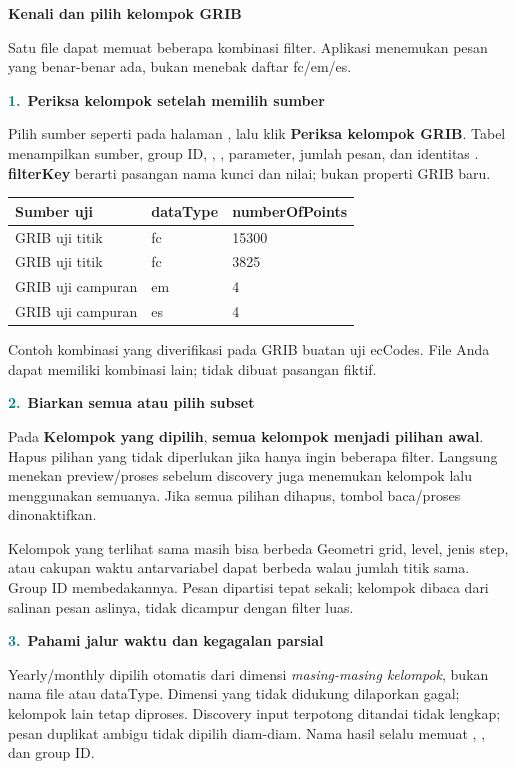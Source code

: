\documentclass[11pt,a4paper]{article}
\newcommand{\step}[2]{\par\addvspace{2mm}\noindent\textcolor{teal}{\textbf{#1.}}\ \textbf{#2}\par\nobreak}
\newcommand{\pagetitle}[3]{\clearpage{\color{teal}\small\bfseries LANGKAH #1}\par{\color{slate}\LARGE\bfseries #2}\par\vspace{2mm}#3\par\vspace{3mm}}
\begin{document}
\pagetitle{9}{Kenali dan pilih kelompok GRIB}{Satu file dapat memuat beberapa kombinasi filter. Aplikasi menemukan pesan yang benar-benar ada, bukan menebak daftar fc/em/es.}
\label{pg:web-groups}
\step{1}{Periksa kelompok setelah memilih sumber}
Pilih sumber seperti pada halaman \pageref{pg:web-input}, lalu klik
\textbf{Periksa kelompok GRIB}. Tabel menampilkan sumber, group ID,
, , parameter, jumlah pesan, dan identitas
. \textbf{filterKey} berarti pasangan nama kunci dan nilai;
bukan properti GRIB baru.
\begin{center}
\begin{tabular}{@{}lll@{}}
\toprule
\textbf{Sumber uji}&\textbf{dataType}&\textbf{numberOfPoints}\\
\midrule
GRIB uji titik&fc&15300\\
GRIB uji titik&fc&3825\\
GRIB uji campuran&em&4\\
GRIB uji campuran&es&4\\
\bottomrule
\end{tabular}\par
\footnotesize Contoh kombinasi yang diverifikasi pada GRIB buatan uji ecCodes.
File Anda dapat memiliki kombinasi lain; tidak dibuat pasangan fiktif.
\end{center}
\step{2}{Biarkan semua atau pilih subset}
Pada \textbf{Kelompok yang dipilih}, \textbf{semua kelompok menjadi pilihan
awal}. Hapus pilihan yang tidak diperlukan jika hanya ingin beberapa filter.
Langsung menekan preview/proses sebelum discovery juga menemukan kelompok lalu
menggunakan semuanya. Jika semua pilihan dihapus, tombol baca/proses dinonaktifkan.
\begin{panel}{Kelompok yang terlihat sama masih bisa berbeda}
Geometri grid, level, jenis step, atau cakupan waktu antarvariabel dapat berbeda
walau jumlah titik sama. Group ID membedakannya. Pesan dipartisi tepat sekali;
kelompok dibaca dari salinan pesan aslinya, tidak dicampur dengan filter luas.
\end{panel}
\step{3}{Pahami jalur waktu dan kegagalan parsial}
Yearly/monthly dipilih otomatis dari dimensi \emph{masing-masing kelompok},
bukan nama file atau dataType. Dimensi yang tidak didukung dilaporkan gagal;
kelompok lain tetap diproses. Discovery input
terpotong ditandai tidak lengkap; pesan duplikat ambigu tidak dipilih diam-diam.
Nama hasil selalu memuat , , dan group ID.
\end{document}
